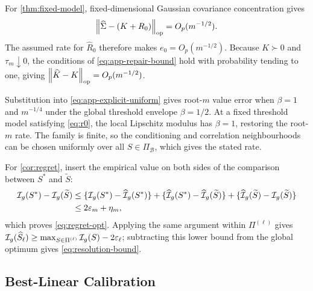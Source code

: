 For \cref{thm:fixed-model}, fixed-dimensional Gaussian covariance
concentration gives
\begin{equation*}
\left\lVert \widehat\Sigma-(K+R_0) \right\rVert_{\mathrm{op}}=O_p(m^{-1/2}).
\end{equation*}
The assumed rate for $\widehat R_0$ therefore makes
$e_0=O_p(m^{-1/2})$. Because $K\succ0$ and
$\tau_m\downarrow0$, the conditions of \eqref{eq:app-repair-bound} hold with
probability tending to one, giving
$\left\lVert \widehat K-K \right\rVert_{\mathrm{op}}=O_p(m^{-1/2})$.

Substitution into \eqref{eq:app-explicit-uniform} gives root-$m$ value error
when $\beta=1$ and $m^{-1/4}$ under the global threshold envelope
$\beta=1/2$. At a fixed threshold model satisfying \eqref{eq:r0}, the local
Lipschitz modulus has $\beta=1$, restoring the root-$m$ rate. The family is
finite, so the conditioning and correlation neighbourhoods can be chosen
uniformly over all $S\in\Pi_{\mathcal B}$, which gives the stated rate.

For \cref{cor:regret}, insert the empirical value on both sides of the
comparison between $S^*$ and $\widetilde S$:
\begin{align*}
\mathcal{I}_g(S^*)-\mathcal{I}_g(\widetilde S)
&\le
\{\mathcal{I}_g(S^*)-\widehat{\mathcal{I}}_g(S^*)\}
+\{\widehat{\mathcal{I}}_g(S^*)-\widehat{\mathcal{I}}_g(\widetilde S)\}
+\{\widehat{\mathcal{I}}_g(\widetilde S)-\mathcal{I}_g(\widetilde S)\}\\
&\le2\varepsilon_m+\eta_m,
\end{align*}
which proves \eqref{eq:regret-opt}. Applying the same argument within
$\Pi^{(\ell)}$ gives
$\mathcal{I}_g(\widehat S_\ell)\ge
\max_{S\in\Pi^{(\ell)}}\mathcal{I}_g(S)-2\varepsilon_\ell$; subtracting this lower
bound from the global optimum gives \eqref{eq:resolution-bound}.

\subsection{Best-Linear Calibration}
\label{sec:app-best-linear}

